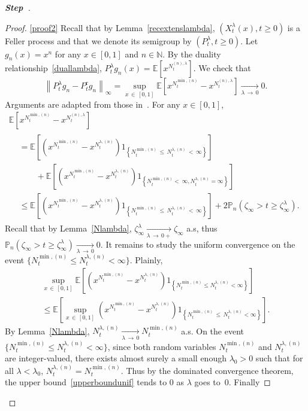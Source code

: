 \documentclass[10pt]{amsart}
\theoremstyle{definition}\newtheorem{defi}[theo]{Definition}\newtheorem{rema}[theo]{Remark}\newtheorem{exam}[theo]{Example}\newtheorem{exem}[theo]{Example}\newtheorem{nota}[theo]{Notation}
\newcommand{\rmr}{\mathrm{r}}
\newcommand{\bbN}{\mathbb{N}}
\newcommand{\bbE}{\mathbb{E}}
\newcommand{\bbP}{\mathbb{P}}
\newcounter{stepcount}
\newenvironment{step}{\refstepcounter{stepcount}\begin{proof}[\textbf{Step~\thestepcount}]}{\end{proof}}
\begin{document}
\begin{step}
\begin{proof}
\noindent\eqref{proof2} Recall that by Lemma~\ref{recextenslambda}, $(X^{\lambda}_t(x),t\geq 0)$ is a Feller process and that we denote its semigroup by $(P_t^{\lambda},t\geq 0)$. Let $g_n(x)=x^{n}$ for any $x\in [0,1]$ and $n\in \bbN$. By the duality relationship~\eqref{duallambda}, $P_t^{\lambda}g_n(x)=\bbE[x^{N^{(n),\lambda}_{t}}]$. We check that
\begin{equation}\label{unifconvsemigroup}
\left\|P_t^{\lambda}g_n-P_t^{\rmr}g_n\right\|_\infty=\sup_{x\,\in\,[0,1]}\bbE\left[x^{N_t^{\min,(n)}}-x^{N^{(n),\lambda}_{t}}\right]\underset{\lambda\,\rightarrow\,0}{\longrightarrow} 0.
\end{equation}
Arguments are adapted from those in~\cite[Section~7]{zbMATH07055671}. For any $x\in [0,1]$,
\begin{multline*}
\bbE\left[x^{N_t^{\min,(n)}}-x^{N^{(n),\lambda}_t}\right]\\
\begin{aligned}
&=\bbE\left[\left(x^{N^{\min,(n)}_{t}}-x^{N_t^{\lambda,(n)}}\right)1_{\left\{N_t^{\min,(n)}\,\leq\,N_t^{\lambda,(n)}\,<\,\infty\right\}}\right]\\
&\qquad +\bbE\left[\left(x^{N^{\min,(n)}_{t}}-x^{N_t^{\lambda,(n)}}\right)1_{\left\{N_t^{\min,(n)}<\,\infty, N_t^{\lambda,(n)}=\infty\right\}}\right]\\
&\leq \bbE\left[\left(x^{N^{\min,(n)}_{t}}-x^{N_t^{\lambda,(n)}}\right)1_{\left\{N_t^{\min,(n)}\,\leq\,N_t^{\lambda,(n)}\,<\,\infty\right\}}\right]+2\bbP_n\left(\zeta_{\infty}>t\geq \zeta_{\infty}^{\lambda}\right).
\end{aligned}
\end{multline*}
Recall that by Lemma~\ref{Nlambda}, $\zeta_{\infty}^{\lambda}\underset{\lambda\, \rightarrow\,0+}{\longrightarrow} \zeta_{\infty}$ a.s, thus $\bbP_n(\zeta_{\infty}>t\geq \zeta_{\infty}^{\lambda})\underset{\lambda\,\rightarrow\,0}{\longrightarrow} 0$. It remains to study the uniform convergence on the event $\{N_t^{\min,(n)}\leq N_t^{\lambda,(n)}<\infty\}$. Plainly,
\begin{multline}\label{upperboundunif}
\underset{x\,\in\,[0,1]}{\sup} \bbE\left[\left(x^{N^{\min,(n)}_{t}}-x^{N_t^{\lambda,(n)}}\right)1_{\left\{N_t^{\min,(n)}\leq N_t^{\lambda,(n)}<\infty\right\}}\right]\\
\leq \bbE\left[\underset{x\,\in\,[0,1]}{\sup}\left(x^{N^{\min,(n)}_{t}}-x^{N_t^{\lambda,(n)}}\right)1_{\left\{N_t^{\min,(n)}\,\leq\,N_t^{\lambda,(n)}<\infty\right\}}\right].
\end{multline}
By Lemma~\ref{Nlambda}, $N_t^{\lambda,(n)} \underset{\lambda\,\rightarrow\,0}{\longrightarrow} N^{\min,(n)}_t$ a.s. On the event $\{N_t^{\min,(n)}\leq N_t^{\lambda,(n)}<\infty\}$, since both random variables $N_t^{\min,(n)}$ and $N_t^{\lambda,(n)}$ are integer-valued, there exists almost surely a small enough $\lambda_0>0$ such that for all $\lambda<\lambda_0$, $N_t^{\lambda,(n)}=N_t^{\min,(n)}$. Thus by the dominated convergence theorem, the upper bound~\eqref{upperboundunif} tends to $0$ as $\lambda$ goes to~$0$. Finally

\end{proof}
\end{step}
\end{document}
